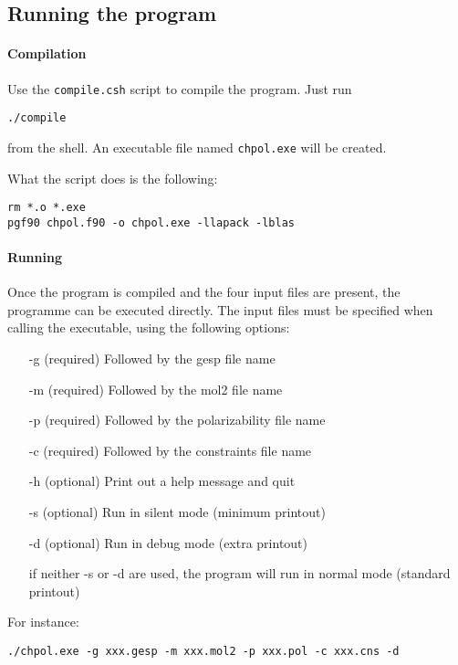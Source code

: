 \documentclass[a4paper]{report}
\begin{document}
\subsection*{Running the program}

\paragraph*{Compilation}

Use the \texttt{compile.csh} script to compile the program. Just run
\begin{verbatim}
./compile
\end{verbatim}
from the shell. An executable file named \texttt{chpol.exe} will be created.

What the script does is the following:
\begin{verbatim}
rm *.o *.exe
pgf90 chpol.f90 -o chpol.exe -llapack -lblas
\end{verbatim}

\paragraph*{Running}

Once the program is compiled and the four input files are present, the programme can
be executed directly. The input files must be specified when calling the executable,
using the following options:
\begin{itemize}
\item[-g] (required) Followed by the gesp file name
\item[-m] (required) Followed by the mol2 file name
\item[-p] (required) Followed by the polarizability file name
\item[-c] (required) Followed by the constraints file name
\item[-h] (optional) Print out a help message and quit
\item[-s] (optional) Run in silent mode (minimum printout)
\item[-d] (optional) Run in debug mode (extra printout)
\item[] if neither -s or -d are used, the program will run in normal mode (standard
printout)
\end{itemize}

For instance:
\begin{verbatim}
./chpol.exe -g xxx.gesp -m xxx.mol2 -p xxx.pol -c xxx.cns -d
\end{verbatim}
\end{document}
